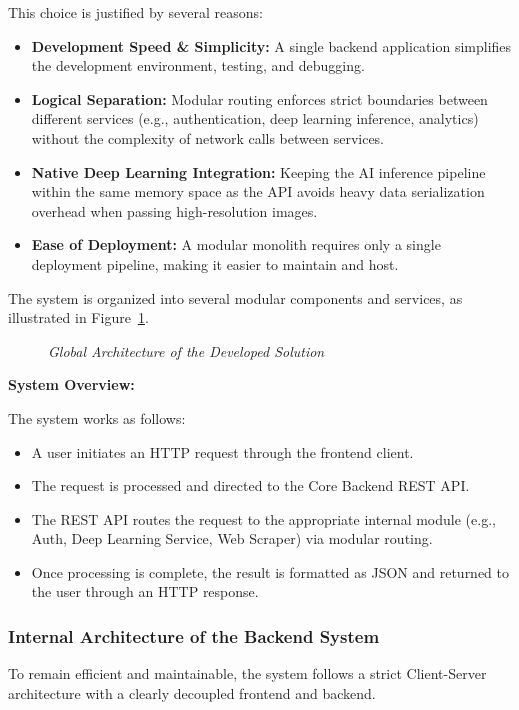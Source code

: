 This choice is justified by several reasons:

\begin{itemize}
	\item \textbf{Development Speed \& Simplicity:} A single backend application simplifies the development environment, testing, and debugging.
	\item \textbf{Logical Separation:} Modular routing enforces strict boundaries between different services (e.g., authentication, deep learning inference, analytics) without the complexity of network calls between services.
	\item \textbf{Native Deep Learning Integration:} Keeping the AI inference pipeline within the same memory space as the API avoids heavy data serialization overhead when passing high-resolution images.
	\item \textbf{Ease of Deployment:} A modular monolith requires only a single deployment pipeline, making it easier to maintain and host.
\end{itemize}

The system is organized into several modular components and services, as illustrated in Figure~\ref{fig:global_arch}.

\begin{figure}[H]
	\centering
	\caption{\textit{Global Architecture of the Developed Solution}}
	\label{fig:global_arch}
\end{figure}


\textbf{System Overview:}

The system works as follows:

\begin{itemize}
	\item A user initiates an HTTP request through the frontend client.
	\item The request is processed and directed to the Core Backend REST API.
	\item The REST API routes the request to the appropriate internal module (e.g., Auth, Deep Learning Service, Web Scraper) via modular routing.
	\item Once processing is complete, the result is formatted as JSON and returned to the user through an HTTP response.
\end{itemize}

\subsubsection{Internal Architecture of the Backend System}
To remain efficient and maintainable, the system follows a strict Client-Server architecture with a clearly decoupled frontend and backend.

